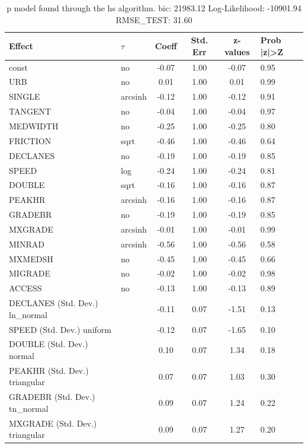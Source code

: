 \begin{table}
	\caption{p model found through the hs algorithm. bic: 21983.12 Log-Likelihood: -10901.94 RMSE_TEST: 31.60}
	\begin{center}
		\begin{tabular}{|l|l|c|c|c|l|}
			\hline
			Effect & $\tau$ & Coeff & Std. Err & z-values & Prob |z|>Z \\
			\hline
			const & no & -0.07 & 1.00 & -0.07 & 0.95 \\
			\hline
			URB & no & 0.01 & 1.00 & 0.01 & 0.99 \\
			\hline
			SINGLE & arcsinh & -0.12 & 1.00 & -0.12 & 0.91 \\
			\hline
			TANGENT & no & -0.04 & 1.00 & -0.04 & 0.97 \\
			\hline
			MEDWIDTH & no & -0.25 & 1.00 & -0.25 & 0.80 \\
			\hline
			FRICTION & sqrt & -0.46 & 1.00 & -0.46 & 0.64 \\
			\hline
			DECLANES & no & -0.19 & 1.00 & -0.19 & 0.85 \\
			\hline
			SPEED & log & -0.24 & 1.00 & -0.24 & 0.81 \\
			\hline
			DOUBLE & sqrt & -0.16 & 1.00 & -0.16 & 0.87 \\
			\hline
			PEAKHR & arcsinh & -0.16 & 1.00 & -0.16 & 0.87 \\
			\hline
			GRADEBR & no & -0.19 & 1.00 & -0.19 & 0.85 \\
			\hline
			MXGRADE & arcsinh & -0.01 & 1.00 & -0.01 & 0.99 \\
			\hline
			MINRAD & arcsinh & -0.56 & 1.00 & -0.56 & 0.58 \\
			\hline
			MXMEDSH & no & -0.45 & 1.00 & -0.45 & 0.66 \\
			\hline
			MIGRADE & no & -0.02 & 1.00 & -0.02 & 0.98 \\
			\hline
			ACCESS & no & -0.13 & 1.00 & -0.13 & 0.89 \\
			\hline
			DECLANES (Std. Dev.) ln_normal &  & -0.11 & 0.07 & -1.51 & 0.13 \\
			\hline
			SPEED (Std. Dev.) uniform &  & -0.12 & 0.07 & -1.65 & 0.10 \\
			\hline
			DOUBLE (Std. Dev.) normal &  & 0.10 & 0.07 & 1.34 & 0.18 \\
			\hline
			PEAKHR (Std. Dev.) triangular &  & 0.07 & 0.07 & 1.03 & 0.30 \\
			\hline
			GRADEBR (Std. Dev.) tn_normal &  & 0.09 & 0.07 & 1.24 & 0.22 \\
			\hline
			MXGRADE (Std. Dev.) triangular &  & 0.09 & 0.07 & 1.27 & 0.20 \\

\end{tabular}
\end{center}
\end{table}
